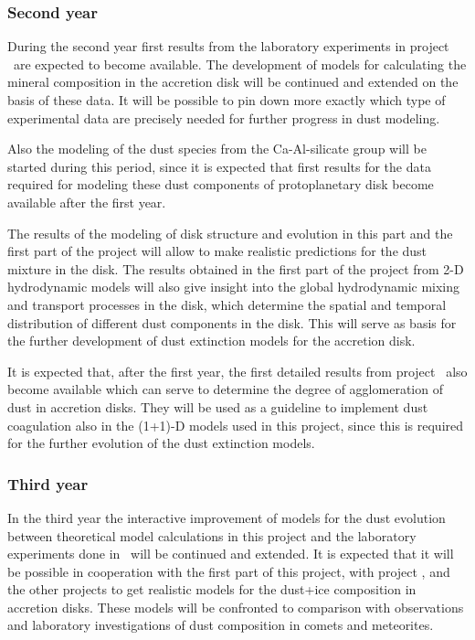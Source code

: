 \subsubsection{Second year}
During the second year first results from the laboratory
experiments in project \projlattard\ are expected to become
available. The development of models for calculating the mineral
composition in the accretion disk will be continued and extended
on the basis of these data. It will be possible to pin down more
exactly which type of experimental data are precisely needed for
further progress in dust modeling.

Also the modeling of the dust species from the Ca-Al-silicate
group will be started during this period, since it is expected
that first results for the data required for modeling these dust
components of protoplanetary disk become available after the first
year.

The results of the modeling of disk structure and evolution in
this part and the first part of the project will allow to make
realistic predictions for the dust mixture in the disk. The
results obtained in the first part of the project from 2-D
hydrodynamic models will also give insight into the global
hydrodynamic mixing and transport processes in the disk, which
determine the spatial and temporal distribution of different dust
components in the disk. This will serve as basis for the further
development of dust extinction models for the accretion disk.

It is expected that, after the first year, the first detailed
results from project \projdul\ also become available which can
serve to determine the degree of agglomeration of dust in
accretion disks. They will be used as a guideline to implement
dust coagulation also in the (1+1)-D models used in this project,
since this is required for the further evolution of the dust
extinction models.

\subsubsection{Third year}
In the third year the interactive improvement of models for the
dust evolution between theoretical model calculations in this
project and the laboratory experiments done in \projlattard\  will
be continued and extended. It is expected  that it will be
possible in cooperation with the first part of this project, with
project \projdul, and the other projects to get realistic models
for the dust+ice composition in accretion disks. These models will
be confronted to comparison with observations and laboratory
investigations of dust composition in comets and meteorites.

